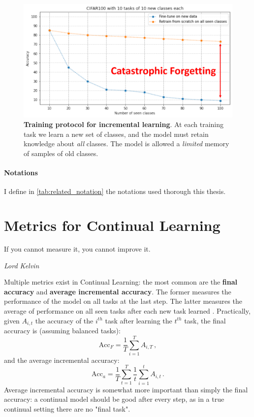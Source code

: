 \begin{figure}[tb]
      \begin{center}
            \includegraphics[width=0.8\linewidth]{images/related/catastrophic_forgetting.pdf}
      \end{center}
      \caption{\textbf{Training protocol for incremental learning}. At each training task we learn a
            new set of classes, and the model must retain knowledge about \textit{all} classes. The
            model is allowed a \textit{limited} memory of samples of old classes.}
      \label{fig:related_forgetting}
\end{figure}

\paragraph{Notations} I define in \autoref{tab:related_notation} the notations used thorough this thesis.



\section{Metrics for Continual Learning}
\label{sec:related_metrics}

\epigraph{If you cannot measure it, you cannot improve it.}{\textit{Lord Kelvin}}

Multiple metrics exist in Continual Learning: the most common are the \textbf{final accuracy} and
\textbf{average incremental accuracy}. The former measures the performance of the model on all tasks
at the last step. The latter measures the average of performance on all seen tasks after each new
task learned \citep{rebuffi2017icarl}. Practically, given $A_{i,t}$ the accuracy of the $i^{th}$
task after
learning the $t^{th}$ task, the final accuracy is (assuming balanced tasks):
%
\begin{equation}
      \text{Acc}_F = \frac{1}{T} \sum_{i=1}^T A_{i,T}\,,
      \label{eq:related_final_acc}
\end{equation}
%
and the average incremental accuracy:
%
\begin{equation}
      \text{Acc}_a = \frac{1}{T} \sum_{t=1}^T \frac{1}{t}  \sum_{i=1}^t A_{i,t}\,.
      \label{eq:related_avg_acc}
\end{equation}
%
Average incremental accuracy is somewhat more important than simply the final accuracy: a continual
model should be good after every step, as in a true continual setting there are no "final task".

